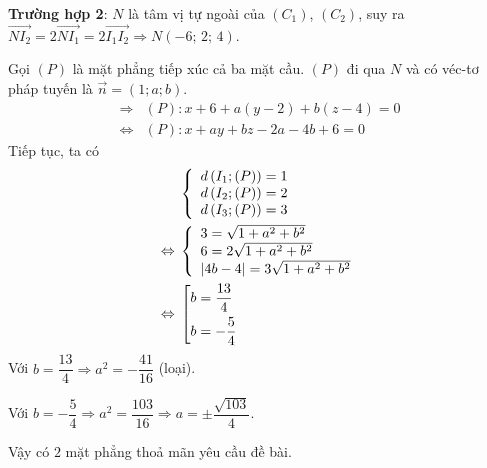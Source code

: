 \begin{ex}
{{	\noindent \textbf{Trường hợp 2}: $N$ là tâm vị tự ngoài của $(C_1)$, $(C_2)$, suy ra $\overrightarrow {N{I_2}}  = 2\overrightarrow {N{I_1}}  = 2\overrightarrow {{I_1}{I_2}}  \Rightarrow N\left( { - 6;\,2;\,4} \right)$.
	}{}
	\noindent Gọi $(P)$ là mặt phẳng tiếp xúc cả ba mặt cầu. $(P)$ đi qua $N$ và có véc-tơ pháp tuyến là $\overrightarrow n = (1;a;b)$.
	\begin{align*}
		\Rightarrow{} &\left( P \right) \colon x + 6 + a\left( {y - 2} \right) + b\left( {z - 4} \right) = 0 \\
		\Leftrightarrow{} &\left( P \right) \colon x + ay + bz - 2a - 4b + 6 = 0
	\end{align*}
	\noindent Tiếp tục, ta có
	\begin{align*}
		&\left\{ {\begin{array}{l}
				{d\left( {{I_1};(P)} \right) = 1} \\ 
				{d\left( {{I_2};(P)} \right) = 2} \\ 
				{d\left( {{I_3};(P)} \right) = 3} 
		\end{array}} \right. \\
		\Leftrightarrow{} &\left\{ \begin{array}{l}
			3 = \sqrt {1 + {a^2} + {b^2}} \\
			6 = 2\sqrt {1 + {a^2} + {b^2}} \\
			\left| {4b - 4} \right| = 3\sqrt {1 + {a^2} + {b^2}}  \hfill \\ 
		\end{array}  \right. \\
		\Leftrightarrow{} &\left[ \begin{gathered}
			b = \frac{{13}}{4} \hfill \\
			b =  - \frac{5}{4} \hfill \\ 
		\end{gathered}  \right.
	\end{align*}
	\noindent Với $b = \dfrac{13}{4} \Rightarrow a^2 = -\dfrac{41}{16}$ (loại).
	
	\noindent Với $b = -\dfrac{5}{4} \Rightarrow {a^2} = \dfrac{{103}}{{16}} \Rightarrow a =  \pm \dfrac{{\sqrt {103} }}{4}$.
	
	\noindent Vậy có $2$ mặt phẳng thoả mãn yêu cầu đề bài.
	}
\end{ex}
